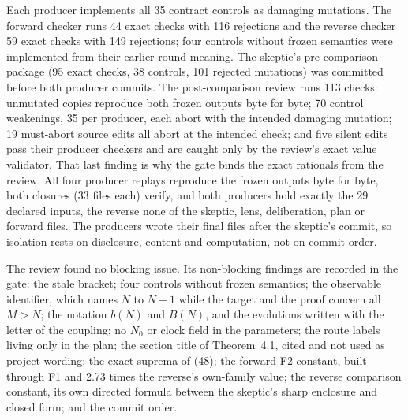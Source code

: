 Each producer implements all 35 contract controls as damaging mutations. The
forward checker runs 44 exact checks with 116 rejections and the reverse
checker 59 exact checks with 149 rejections; four controls without frozen
semantics were implemented from their earlier-round meaning. The skeptic's
pre-comparison package (95 exact checks, 38 controls, 101 rejected
mutations) was committed before both producer commits. The post-comparison
review runs 113 checks: unmutated copies reproduce both frozen outputs byte
for byte; 70 control weakenings, 35 per producer, each abort with the
intended damaging mutation; 19 must-abort source edits all abort at the
intended check; and five silent edits pass their producer checkers and are
caught only by the review's exact value validator. That last finding is why
the gate binds the exact rationals from the review. All four producer replays
reproduce the frozen outputs byte for byte, both closures (33 files each)
verify, and both producers hold exactly the 29 declared inputs, the reverse
none of the skeptic, lens, deliberation, plan or forward files. The producers
wrote their final files after the skeptic's commit, so isolation rests on
disclosure, content and computation, not on commit order.

The review found no blocking issue. Its non-blocking findings are recorded in
the gate: the stale bracket; four controls without frozen semantics; the
observable identifier, which names $N$ to $N+1$ while the target and the proof
concern all $M>N$; the notation $b(N)$ and $B(N)$, and the evolutions written
with the letter of the coupling; no $N_0$ or clock field in the parameters;
the route labels living only in the plan; the section title of Theorem~4.1,
cited and not used as project wording; the exact suprema of (48); the forward
F2 constant, built through F1 and 2.73 times the reverse's own-family value;
the reverse comparison constant, its own directed formula between the
skeptic's sharp enclosure and closed form; and the commit order.

